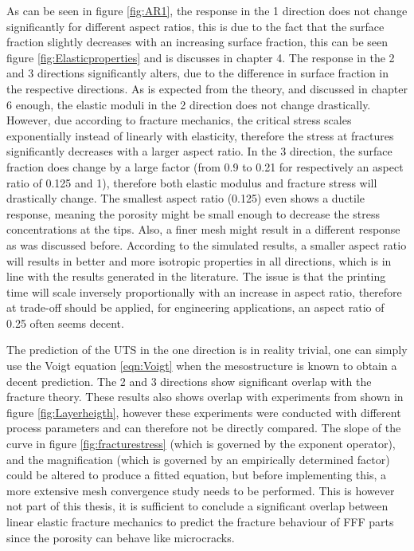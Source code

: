 As can be seen in figure \ref{fig:AR1}, the response in the 1 direction does not change significantly for different aspect ratios, this is due to the fact that the surface fraction slightly decreases with an increasing surface fraction, this can be seen figure \ref{fig:Elasticproperties} and is discusses in chapter 4. The response in the 2 and 3 directions significantly alters, due to the difference in surface fraction in the respective directions. As is expected from the theory, and discussed in chapter 6 enough, the elastic moduli in the 2 direction does not change drastically. However, due according to fracture mechanics, the critical stress scales exponentially instead of linearly with elasticity, therefore the stress at fractures significantly decreases with a larger aspect ratio.  In the 3 direction, the surface fraction does change by a large factor (from 0.9 to 0.21 for respectively an aspect ratio of 0.125 and 1), therefore both elastic modulus and fracture stress will drastically change. The smallest aspect ratio (0.125) even shows a ductile response, meaning the porosity might be small enough to decrease the stress concentrations at the tips. Also, a finer mesh might result in a different response as was discussed before. 
According to the simulated results, a smaller aspect ratio will results in better and more isotropic properties in all directions, which is in line with the results generated in the literature. The issue is that the printing time will scale  inversely proportionally with an increase in  aspect ratio, therefore at trade-off should be applied, for engineering applications, an aspect ratio of 0.25 often seems decent. 

The prediction of the UTS in the one direction is in reality trivial, one can simply use the Voigt equation \ref{eqn:Voigt} when the mesostructure is known to obtain a decent prediction.  The 2 and 3 directions show significant overlap with the fracture theory. These results also shows overlap with experiments from \cite{Li2017TheProperties} shown in figure \ref{fig:Layerheigth}, however these experiments were conducted with different process parameters and can therefore not be directly compared. The slope of the curve in figure \ref{fig:fracturestress} (which is governed by the exponent operator), and the magnification (which is governed by an empirically determined factor) could be altered to produce a fitted equation, but before implementing this, a more extensive mesh convergence study needs to be performed. This is however not part of this thesis, it is sufficient to conclude a significant overlap between linear elastic fracture mechanics to predict the fracture behaviour of FFF parts since the porosity can behave like microcracks. 

